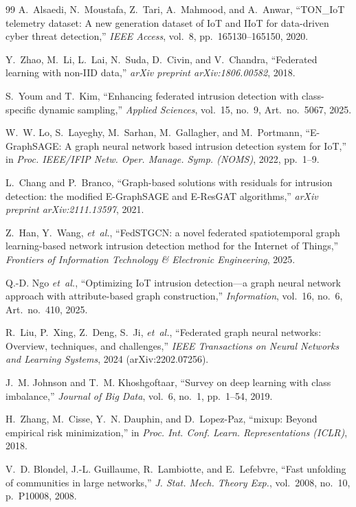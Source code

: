 \documentclass[journal,onecolumn]{IEEEtran}
\begin{document}
\begin{thebibliography}{99}
A.~Alsaedi, N.~Moustafa, Z.~Tari, A.~Mahmood, and A.~Anwar, ``TON\_IoT telemetry dataset: A new generation dataset of IoT and IIoT for data-driven cyber threat detection,'' \emph{IEEE Access}, vol.~8, pp.~165130--165150, 2020.

Y.~Zhao, M.~Li, L.~Lai, N.~Suda, D.~Civin, and V.~Chandra, ``Federated learning with non-IID data,'' \emph{arXiv preprint arXiv:1806.00582}, 2018.

S.~Youm and T.~Kim, ``Enhancing federated intrusion detection with class-specific dynamic sampling,'' \emph{Applied Sciences}, vol.~15, no.~9, Art.~no.~5067, 2025.

W.~W. Lo, S.~Layeghy, M.~Sarhan, M.~Gallagher, and M.~Portmann, ``E-GraphSAGE: A graph neural network based intrusion detection system for IoT,'' in \emph{Proc. IEEE/IFIP Netw. Oper. Manage. Symp. (NOMS)}, 2022, pp.~1--9.

L.~Chang and P.~Branco, ``Graph-based solutions with residuals for intrusion detection: the modified E-GraphSAGE and E-ResGAT algorithms,'' \emph{arXiv preprint arXiv:2111.13597}, 2021.

Z.~Han, Y.~Wang, \emph{et~al.}, ``FedSTGCN: a novel federated spatiotemporal graph learning-based network intrusion detection method for the Internet of Things,'' \emph{Frontiers of Information Technology \& Electronic Engineering}, 2025.

Q.-D. Ngo \emph{et~al.}, ``Optimizing IoT intrusion detection---a graph neural network approach with attribute-based graph construction,'' \emph{Information}, vol.~16, no.~6, Art.~no.~410, 2025.

R.~Liu, P.~Xing, Z.~Deng, S.~Ji, \emph{et~al.}, ``Federated graph neural networks: Overview, techniques, and challenges,'' \emph{IEEE Transactions on Neural Networks and Learning Systems}, 2024 (arXiv:2202.07256).

J.~M. Johnson and T.~M. Khoshgoftaar, ``Survey on deep learning with class imbalance,'' \emph{Journal of Big Data}, vol.~6, no.~1, pp.~1--54, 2019.

H.~Zhang, M.~Cisse, Y.~N. Dauphin, and D.~Lopez-Paz, ``mixup: Beyond empirical risk minimization,'' in \emph{Proc. Int. Conf. Learn. Representations (ICLR)}, 2018.

V.~D. Blondel, J.-L. Guillaume, R.~Lambiotte, and E.~Lefebvre, ``Fast unfolding of communities in large networks,'' \emph{J. Stat. Mech. Theory Exp.}, vol.~2008, no.~10, p.~P10008, 2008.


\end{thebibliography}
\end{document}
